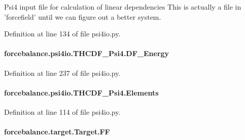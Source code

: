 Psi4 input file for calculation of linear dependencies This is actually a file in 'forcefield' until we can figure out a better system. 



Definition at line 134 of file psi4io.\-py.

\hypertarget{classforcebalance_1_1psi4io_1_1THCDF__Psi4_a5992e04d0a4b8d1e96ad10ec58e7d06a}{
\paragraph[{D\-F\-\_\-\-Energy}]{\setlength{\rightskip}{0pt plus 5cm}forcebalance.\-psi4io.\-T\-H\-C\-D\-F\-\_\-\-Psi4.\-D\-F\-\_\-\-Energy}}\label{classforcebalance_1_1psi4io_1_1THCDF__Psi4_a5992e04d0a4b8d1e96ad10ec58e7d06a}


Definition at line 237 of file psi4io.\-py.

\hypertarget{classforcebalance_1_1psi4io_1_1THCDF__Psi4_affc5bc01af54d89e452f324c78d1bc1c}{
\paragraph[{Elements}]{\setlength{\rightskip}{0pt plus 5cm}forcebalance.\-psi4io.\-T\-H\-C\-D\-F\-\_\-\-Psi4.\-Elements}}\label{classforcebalance_1_1psi4io_1_1THCDF__Psi4_affc5bc01af54d89e452f324c78d1bc1c}


Definition at line 114 of file psi4io.\-py.

\hypertarget{classforcebalance_1_1target_1_1Target_a38a37919783141ea37fdcf8b00ce0aaf}{
\paragraph[{F\-F}]{\setlength{\rightskip}{0pt plus 5cm}forcebalance.\-target.\-Target.\-F\-F\hspace{0.3cm}{\ttfamily [inherited]}}}\label{classforcebalance_1_1target_1_1Target_a38a37919783141ea37fdcf8b00ce0aaf}



